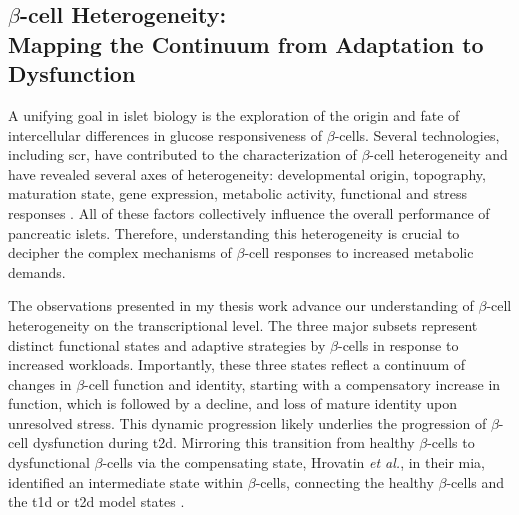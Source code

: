 \subsection[$\beta$-cell Heterogeneity:\\Mapping the Continuum from Adaptation to Dysfunction]{$\beta$-cell Heterogeneity:\\Mapping the Continuum from Adaptation to Dysfunction}

\vspace{20pt}
\par A unifying goal in islet biology is the exploration of the origin and fate of intercellular differences in glucose responsiveness of $\beta$-cells. Several technologies, including \gls{scr}, have contributed to the characterization of $\beta$-cell heterogeneity and have revealed several axes of heterogeneity: developmental origin, topography, maturation state, gene expression, metabolic activity, functional and stress responses \textbf{\cite{miranda_pancreatic_2021}}. All of these factors collectively influence the overall performance of pancreatic islets. Therefore, understanding this heterogeneity is crucial to decipher the complex mechanisms of $\beta$-cell responses to increased metabolic demands.

\par The observations presented in my thesis work advance our understanding of $\beta$-cell heterogeneity on the transcriptional level. The three major subsets represent distinct functional states and adaptive strategies by $\beta$-cells in response to increased workloads. Importantly, these three states reflect a continuum of changes in $\beta$-cell function and identity, starting with a compensatory increase in function, which is followed by a decline, and loss of mature identity upon unresolved stress. This dynamic progression likely underlies the progression of $\beta$-cell dysfunction during \gls{t2d}. Mirroring this transition from healthy $\beta$-cells to dysfunctional $\beta$-cells via the compensating state, Hrovatin \textit{et al.}, in their \gls{mia}, identified an intermediate state within $\beta$-cells, connecting the healthy $\beta$-cells and the \gls{t1d} or \gls{t2d} model states \textbf{\cite{hrovatin_delineating_2023}}.\\


